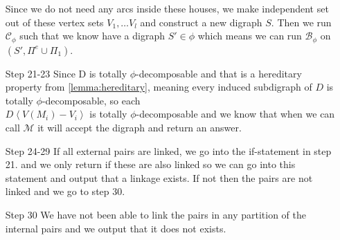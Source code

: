 \begin{itemize}
    Since we do not need any arcs inside these houses, we make independent set out of these vertex sets $V_1,\dots V_l$ and construct a new digraph $S$. 
    Then we run $\mathcal{C}_\phi$ such that we know have a digraph $S'\in \phi$ which means we can run $\mathcal{B}_\phi$ on $(S',\Pi^e\cup \Pi_1)$.    
    \item[Step 21-23] Since D is totally $\phi$-decomposable and that is a hereditary property from \autoref{lemma:hereditary}, meaning every induced subdigraph of $D$ is totally $\phi$-decomposable, so each \\$D\left< V(M_i)-V_i \right>$ is totally $\phi$-decomposable and we know that when we can call $\mathcal{M}$ it will accept the digraph and return an answer.
    \item[Step 24-29] If all external pairs are linked, we go into the if-statement in step 21. and we only return if these are also linked so we can go into this statement and output that a linkage exists. If not then the pairs are not linked and we go to step 30.  
    \item[Step 30] We have not been able to link the pairs in any partition of the internal pairs and we output that it does not exists.
\end{itemize}

